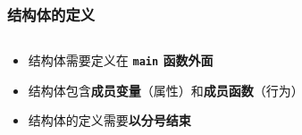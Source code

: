 \begin{frame}[fragile]
    \frametitle{结构体的定义}
    \begin{columns}

        
    
    \end{columns}

    \begin{itemize}
        \vspace{.5cm}    
        \item<2-> 结构体需要定义在 \textbf{\lstinline|main| 函数外面}
        \item<3-> 结构体包含\textbf{成员变量}（属性）和\textbf{成员函数}（行为）
        \item<4-> 结构体的定义需要\textbf{以分号结束}
    \end{itemize}

\end{frame}


